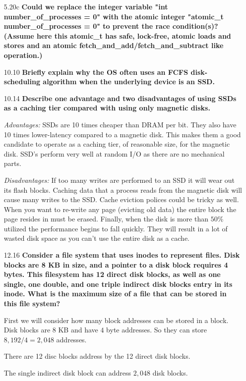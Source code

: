 \documentclass[11pt, letterpaper]{hw}
\begin{document}
\begin{enumerate}
\item [5.20c] \textbf{Could we replace the integer variable "int number\_of\_processes = 0" with the atomic integer "atomic\_t number\_of\_processes = 0" to prevent the race condition(s)? (Assume here this atomic\_t has safe, lock-free, atomic loads and stores and an atomic fetch\_and\_add/fetch\_and\_subtract like operation.)}

\item [10.10] \textbf{Briefly explain why the OS often uses an FCFS disk-scheduling algorithm when the underlying device is an SSD.}

\item [10.14] \textbf{Describe one advantage and two disadvantages of using SSDs as a caching tier compared with using only magnetic disks.}

{\it Advantages:} SSDs are 10 times cheaper than DRAM per bit. They also have 10 times lower-latency compared to a magnetic disk. This makes them a good candidate to operate as a caching tier, of reasonable size, for the magnetic disk. SSD's perform very well at random I/O as there are no mechanical parts.

{\it Disadvantages:} If too many writes are performed to an SSD it will wear out its flash blocks. Caching data that a process reads from the magnetic disk will cause many writes to the SSD. Cache eviction polices could be tricky as well. When you want to re-write any page (evicting old data) the entire block the page resides in must be erased. Finally, when the disk is more than $50\%$ utilized the performance begins to fall quickly. They will result in a lot of wasted disk space as you can't use the entire disk as a cache.
 
\item [12.16] \textbf{Consider a file system that uses inodes to represent files. Disk blocks are 8 KB in size, and a pointer to a disk block requires 4 bytes. This filesystem has 12 direct disk blocks, as well as one single, one double, and one triple indirect disk blocks entry in its inode. What is the maximum size of a file that can be stored in this file system?}

First we will consider how many block addresses can be stored in a block. Disk blocks are $8$ KB and have $4$ byte addresses. So they can store $8,192 / 4 = 2,048$ addresses.

There are 12 disc blocks address by the 12 direct disk blocks. 

The single indirect disk block can address $2,048$ disk blocks. 


\end{enumerate}
\end{document}
